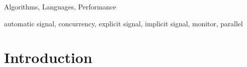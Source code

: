 \documentclass[preprint]{sigplanconf}
\begin{document}

\terms
Algorithms, Languages, Performance 

\keywords
automatic signal, concurrency, explicit signal, implicit signal, monitor, 
parallel




\section{Introduction} \label{sec:intro}



\end{document}
